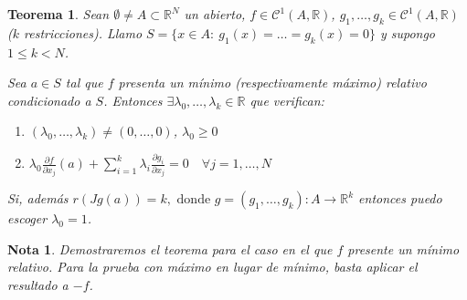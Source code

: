 \documentclass[11pt, a4paper]{article}
\newcommand{\R}{\mathbb{R}}
\theoremstyle{theorem-style}
\newtheorem*{nth}{Teorema}
\theoremstyle{definition-style}
\theoremstyle{remark-style}
\newtheorem*{nota}{Nota}
\theoremstyle{example-style}
\newenvironment{nlist}
{\begin{enumerate}
\renewcommand\labelenumi{(\emph{\roman{enumi})}}}
{\end{enumerate}}
\begin{document}
\begin{nth} Sean $\emptyset \ne A \subset \mathbb{R}^N$ un abierto, $f\in \mathcal{C}^1(A, \R)$, $g_1, \dots, g_k \in \mathcal{C}^1(A,\R)$ ($k$ restricciones). Llamo $S = \{ x\in A :\ g_1(x) = \dots = g_k(x) = 0 \}$ y supongo $1\le k < N$.
	
Sea $a \in S$ tal que $f$ presenta un mínimo (respectivamente máximo) relativo condicionado a $S$. Entonces $\exists \lambda_0, \dots, \lambda_k\in \R$ que verifican:

\begin{nlist}
	\item $(\lambda_0, \dots, \lambda_k) \ne (0, \dots, 0)$, $\lambda_0 \ge 0$
	\item $\lambda_0 \displaystyle\frac{\partial f}{\partial x_j}(a) + \sum_{i=1}^k \lambda_i \displaystyle\frac{\partial g_i}{\partial x_j} = 0 \quad \forall j=1,\dots, N$
\end{nlist}

Si, además $r(Jg(a)) = k, \text{ donde } g = (g_1, \dots, g_k) : A \to \R^k$ entonces puedo escoger $\lambda_0 = 1$.
\end{nth}
\begin{nota}Demostraremos el teorema para el caso en el que $f$ presente un mínimo relativo. Para la prueba con máximo en lugar de mínimo, basta aplicar el resultado a $-f$.
	\end{nota}
\end{document}
